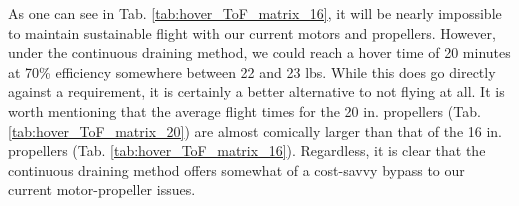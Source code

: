 \documentclass{article}
\begin{document}
As one can see in Tab. \ref{tab:hover_ToF_matrix_16}, it will be nearly impossible to maintain sustainable flight with our current motors and propellers. However, under the continuous draining method, we could reach a hover time of 20 minutes at 70\% efficiency somewhere between 22 and 23 lbs. While this does go directly against a requirement, it is certainly a better alternative to not flying at all. It is worth mentioning that the average flight times for the 20 in. propellers (Tab. \ref{tab:hover_ToF_matrix_20}) are almost comically larger than that of the 16 in. propellers (Tab. \ref{tab:hover_ToF_matrix_16}). Regardless, it is clear that the continuous draining method offers somewhat of a cost-savvy bypass to our current motor-propeller issues.



\end{document}
